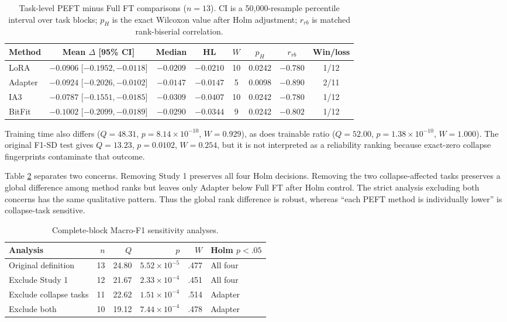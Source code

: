 \documentclass{SPC}
\begin{document}
\begin{table}[!t]
\caption{Task-level PEFT minus Full FT comparisons ($n=13$). CI is a 50,000-resample percentile interval over task blocks; $p_H$ is the exact Wilcoxon value after Holm adjustment; $r_{rb}$ is matched rank-biserial correlation.}
\label{tab:pairwise}
\centering
\footnotesize
\setlength{\tabcolsep}{3.3pt}
\begin{tabular}{lccccccc}
\toprule
Method & Mean $\Delta$ [95\% CI] & Median & HL & $W$ & $p_H$ & $r_{rb}$ & Win/loss \\
\midrule
LoRA & $-0.0906$ [$-0.1952,-0.0118$] & $-0.0209$ & $-0.0210$ & 10 & 0.0242 & $-0.780$ & 1/12 \\
Adapter & $-0.0924$ [$-0.2026,-0.0102$] & $-0.0147$ & $-0.0147$ & 5 & 0.0098 & $-0.890$ & 2/11 \\
IA3 & $-0.0787$ [$-0.1551,-0.0185$] & $-0.0309$ & $-0.0407$ & 10 & 0.0242 & $-0.780$ & 1/12 \\
BitFit & $-0.1002$ [$-0.2099,-0.0189$] & $-0.0290$ & $-0.0344$ & 9 & 0.0242 & $-0.802$ & 1/12 \\
\bottomrule
\end{tabular}
\end{table}

Training time also differs ($Q=48.31$, $p=8.14\times10^{-10}$, $W=0.929$), as does trainable ratio ($Q=52.00$, $p=1.38\times10^{-10}$, $W=1.000$). The original F1-SD test gives $Q=13.23$, $p=0.0102$, $W=0.254$, but it is not interpreted as a reliability ranking because exact-zero collapse fingerprints contaminate that outcome.

Table \ref{tab:sensitivity} separates two concerns. Removing Study 1 preserves all four Holm decisions. Removing the two collapse-affected tasks preserves a global difference among method ranks but leaves only Adapter below Full FT after Holm control. The strict analysis excluding both concerns has the same qualitative pattern. Thus the global rank difference is robust, whereas ``each PEFT method is individually lower'' is collapse-task sensitive.

\begin{table}[!t]
\caption{Complete-block Macro-F1 sensitivity analyses.}
\label{tab:sensitivity}
\centering
\scriptsize
\setlength{\tabcolsep}{2.8pt}
\begin{tabular}{lrrrrl}
\toprule
Analysis & $n$ & $Q$ & $p$ & $W$ & Holm $p<.05$ \\
\midrule
Original definition & 13 & 24.80 & $5.52\!\times\!10^{-5}$ & .477 & All four \\
Exclude Study 1 & 12 & 21.67 & $2.33\!\times\!10^{-4}$ & .451 & All four \\
Exclude collapse tasks & 11 & 22.62 & $1.51\!\times\!10^{-4}$ & .514 & Adapter \\
Exclude both & 10 & 19.12 & $7.44\!\times\!10^{-4}$ & .478 & Adapter \\
\bottomrule
\end{tabular}
\end{table}
\end{document}
